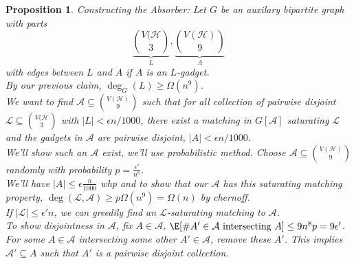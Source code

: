 \documentclass[a4paper]{article}
\newtheorem{prop}[thm]{Proposition}
\begin{document}
\begin{prop}
    Constructing the Absorber: Let $G$ be an auxilary bipartite graph with parts \[
    \underbrace{\binom{V(\mathcal{H}}{3}}_{L}, \underbrace{\binom{V(\mathcal{H})}{9}}_{A}
    \] 
    with edges between $L$ and $A$ if $A$ is an $L$-gadget. \\
    By our previous claim, $\deg_G(L)\geq \Omega(n^9)$. \\
    We want to find $\mathcal{A}\subseteq {V(\mathcal{H}) \choose 9}$ such that for all collection of pairwise disjoint $\mathcal{L}\subseteq {V(\mathcal{H} \choose 3}$ with $|L|<\epsilon n/1000$, there exist a matching in $G[\mathcal{A}]$ saturating $\mathcal{L}$ and the gadgets in $\mathcal{A}$ are pairwise disjoint, $|A|<\epsilon n /1000$. \\
    We'll show such an $\mathcal{A}$ exist, we'll use probabilistic method. Choose $\mathcal{A}\subseteq {V(\mathcal{H}) \choose 9}$ randomly with probability $p=\frac{\epsilon'}{n^8}$. \\
    We'll have $|A|\leq \epsilon \frac{n}{1000}$ whp and to show that our $\mathcal{A}$ has this saturating matching property, $\deg(\mathcal{L},\mathcal{A})\geq p \Omega(n^9)=\Omega(n)$ by chernoff. \\
    If $|\mathcal{L}|\leq \epsilon'n$, we can greedily find an $\mathcal{L}$-saturating matching to $\mathcal{A}$. \\
    To show disjointness in $\mathcal{A}$, fix $A\in \mathcal{A}$, $\E[\#A'\in \mathcal{A} \text{ intersecting $A$}]\leq 9n^8p=9\epsilon'$. For some $A\in \mathcal{A}$ intersecting some other $A'\in \mathcal{A}$, remove these $A'$. This implies $\mathcal{A}'\subseteq A$ such that $A'$ is a pairwise disjoint collection. 
\end{prop}
\newpage
\end{document}

